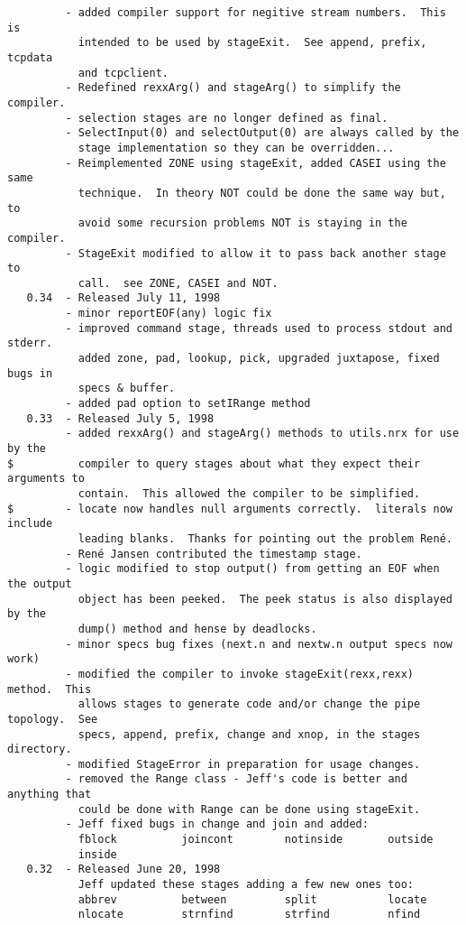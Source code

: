 \begin{verbatim}
         - added compiler support for negitive stream numbers.  This is
           intended to be used by stageExit.  See append, prefix, tcpdata
           and tcpclient.
         - Redefined rexxArg() and stageArg() to simplify the compiler.
         - selection stages are no longer defined as final.
         - SelectInput(0) and selectOutput(0) are always called by the
           stage implementation so they can be overridden...
         - Reimplemented ZONE using stageExit, added CASEI using the same
           technique.  In theory NOT could be done the same way but, to
           avoid some recursion problems NOT is staying in the compiler.
         - StageExit modified to allow it to pass back another stage to
           call.  see ZONE, CASEI and NOT.
   0.34  - Released July 11, 1998
         - minor reportEOF(any) logic fix
         - improved command stage, threads used to process stdout and stderr.
           added zone, pad, lookup, pick, upgraded juxtapose, fixed bugs in
           specs & buffer.
         - added pad option to setIRange method
   0.33  - Released July 5, 1998
         - added rexxArg() and stageArg() methods to utils.nrx for use by the
$          compiler to query stages about what they expect their arguments to
           contain.  This allowed the compiler to be simplified.
$        - locate now handles null arguments correctly.  literals now include
           leading blanks.  Thanks for pointing out the problem René.
         - René Jansen contributed the timestamp stage.
         - logic modified to stop output() from getting an EOF when the output
           object has been peeked.  The peek status is also displayed by the
           dump() method and hense by deadlocks.
         - minor specs bug fixes (next.n and nextw.n output specs now work)
         - modified the compiler to invoke stageExit(rexx,rexx) method.  This
           allows stages to generate code and/or change the pipe topology.  See
           specs, append, prefix, change and xnop, in the stages directory.
         - modified StageError in preparation for usage changes.
         - removed the Range class - Jeff's code is better and anything that
           could be done with Range can be done using stageExit.
         - Jeff fixed bugs in change and join and added:
           fblock          joincont        notinside       outside
           inside
   0.32  - Released June 20, 1998
           Jeff updated these stages adding a few new ones too:
           abbrev          between         split           locate
           nlocate         strnfind        strfind         nfind

\end{verbatim}
